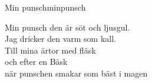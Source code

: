 \begin{song}{Min punsch}{minpunsch}
\begin{vers}
\repopen Min punsch den är söt och ljusgul.\\
Jag dricker den varm som kall.\\
Till mina ärtor med fläsk\\
och efter en Bäsk\\
när punschen smakar som bäst i magen \repclose\\
\end{vers}
\end{song}
